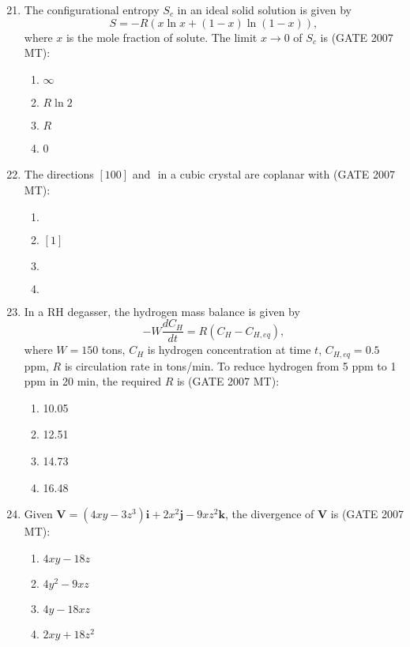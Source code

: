 \documentclass[12pt]{article}
\begin{document}
\begin{enumerate}

\setcounter{enumi}{20} %

\item The configurational entropy \(S_c\) in an ideal solid solution is given by
\[
S = -R \left( x \ln x + (1-x) \ln (1-x) \right),
\]
where \(x\) is the mole fraction of solute. The limit \(x \to 0\) of \(S_c\) is (GATE 2007 MT):
\begin{enumerate}
  \item \(\infty\)
  \item \(R \ln 2\)
  \item \(R\)
  \item 0
\end{enumerate}

\item The directions \([100]\) and \(\) in a cubic crystal are coplanar with (GATE 2007 MT):
\begin{enumerate}
  \item \(\)
  \item \([1]\)
  \item \(\)
  \item \(\)
\end{enumerate}

\item In a RH degasser, the hydrogen mass balance is given by
\[
- W \frac{dC_H}{dt} = R (C_H - C_{H,eq}),
\]
where \(W=150\) tons, \(C_H\) is hydrogen concentration at time \(t\), \(C_{H,eq}=0.5\) ppm, \(R\) is circulation rate in tons/min. To reduce hydrogen from 5 ppm to 1 ppm in 20 min, the required \(R\) is (GATE 2007 MT):
\begin{enumerate}
  \item 10.05
  \item 12.51
  \item 14.73
  \item 16.48
\end{enumerate}

\item Given \(\mathbf{V} = (4xy - 3z^3)\mathbf{i} + 2x^2 \mathbf{j} - 9xz^2 \mathbf{k}\), the divergence of \(\mathbf{V}\) is (GATE 2007 MT):
\begin{enumerate}
  \item \(4xy - 18z\)
  \item \(4y^2 - 9xz\)
  \item \(4y - 18xz\)
  \item \(2xy + 18 z^2\)
\end{enumerate}


\end{enumerate}
\end{document}
